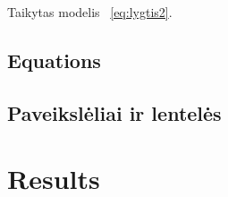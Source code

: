 \documentclass[conference]{IEEEtran}
\begin{document}
Taikytas modelis ~\eqref{eq:lygtis2}.



\subsection{Equations}



\subsection{Paveikslėliai ir lentelės}




\section{Results}

%
%
\printbibliography[heading=bibintoc]
\end{document}
